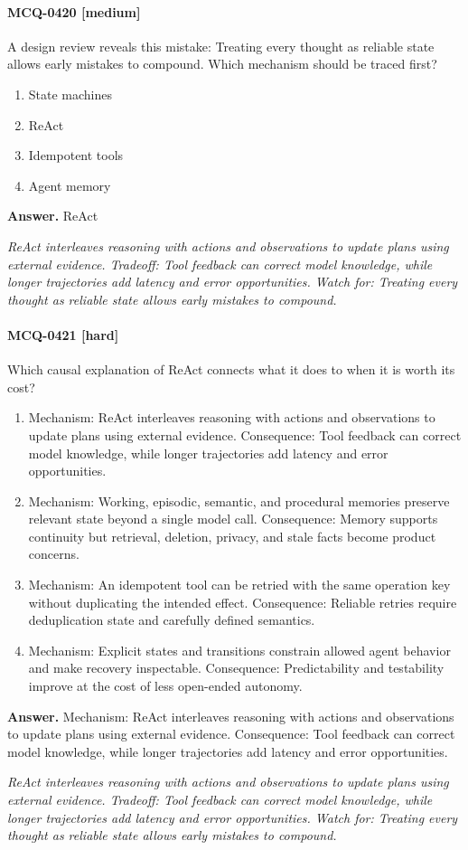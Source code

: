 \paragraph{MCQ-0420 [medium]} A design review reveals this mistake: Treating every thought as reliable state allows early mistakes to compound. Which mechanism should be traced first?
\begin{enumerate}[label=\Alph*.]
\item State machines
\item ReAct
\item Idempotent tools
\item Agent memory
\end{enumerate}
\noindent\textbf{Answer.} ReAct
\par\textit{ReAct interleaves reasoning with actions and observations to update plans using external evidence. Tradeoff: Tool feedback can correct model knowledge, while longer trajectories add latency and error opportunities. Watch for: Treating every thought as reliable state allows early mistakes to compound.}
\paragraph{MCQ-0421 [hard]} Which causal explanation of ReAct connects what it does to when it is worth its cost?
\begin{enumerate}[label=\Alph*.]
\item Mechanism: ReAct interleaves reasoning with actions and observations to update plans using external evidence. Consequence: Tool feedback can correct model knowledge, while longer trajectories add latency and error opportunities.
\item Mechanism: Working, episodic, semantic, and procedural memories preserve relevant state beyond a single model call. Consequence: Memory supports continuity but retrieval, deletion, privacy, and stale facts become product concerns.
\item Mechanism: An idempotent tool can be retried with the same operation key without duplicating the intended effect. Consequence: Reliable retries require deduplication state and carefully defined semantics.
\item Mechanism: Explicit states and transitions constrain allowed agent behavior and make recovery inspectable. Consequence: Predictability and testability improve at the cost of less open-ended autonomy.
\end{enumerate}
\noindent\textbf{Answer.} Mechanism: ReAct interleaves reasoning with actions and observations to update plans using external evidence. Consequence: Tool feedback can correct model knowledge, while longer trajectories add latency and error opportunities.
\par\textit{ReAct interleaves reasoning with actions and observations to update plans using external evidence. Tradeoff: Tool feedback can correct model knowledge, while longer trajectories add latency and error opportunities. Watch for: Treating every thought as reliable state allows early mistakes to compound.}
